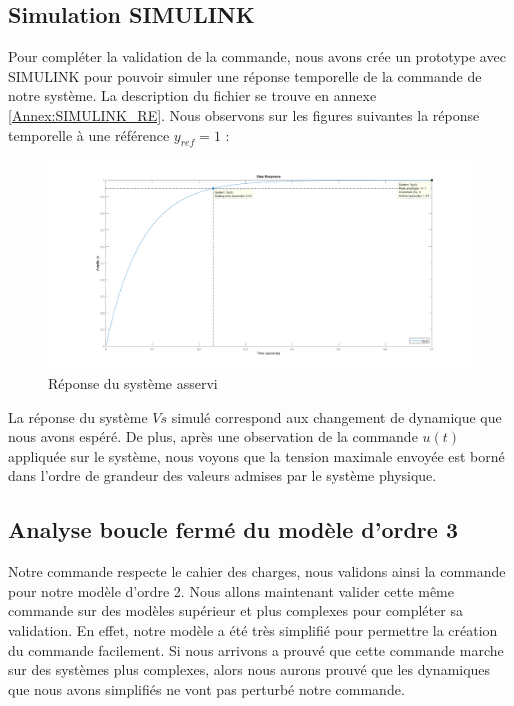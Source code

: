 \subsection{Simulation SIMULINK}
Pour compléter la validation de la commande, nous avons crée un prototype avec SIMULINK pour pouvoir simuler une réponse temporelle de la commande de notre système. La description du fichier se trouve en annexe \ref{Annex:SIMULINK_RE}. Nous observons sur les figures suivantes la réponse temporelle à une référence $y_{ref} = 1$ : 
\begin{figure}[!ht]
\begin{center}
\includegraphics[width = \textwidth]{./III/figure/stepEE2bf.png}
\caption{Réponse du système asservi}
\end{center}
\end{figure}
La réponse du système $Vs$ simulé correspond aux changement de dynamique que nous avons espéré. De plus, après une observation de la commande $u(t)$ appliquée sur le système, nous voyons que la tension maximale envoyée est borné dans l'ordre de grandeur des valeurs admises par le système physique. 


\subsection{Analyse boucle fermé du modèle d'ordre 3}
Notre commande respecte le cahier des charges, nous validons ainsi la commande pour notre modèle d'ordre 2. Nous allons maintenant valider cette même commande sur des modèles supérieur et plus complexes pour compléter sa validation. En effet, notre modèle a été très simplifié pour permettre la création du commande facilement. Si nous arrivons a prouvé que cette commande marche sur des systèmes plus complexes, alors nous aurons prouvé que les dynamiques que nous avons simplifiés ne vont pas perturbé notre commande.

